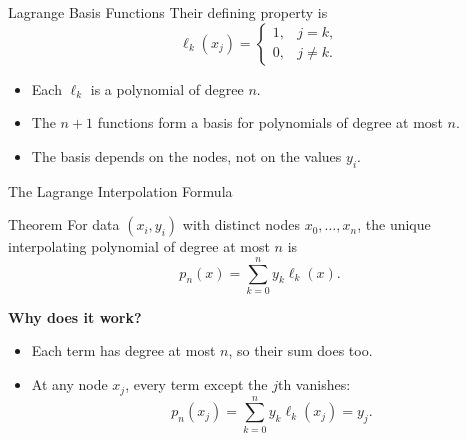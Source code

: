\documentclass[10pt]{beamer}
\begin{document}
\begin{frame}{Lagrange Basis Functions}
Their defining property is
\[
\ell_k(x_j)=
\begin{cases}
1,&j=k,\\
0,&j\ne k.
\end{cases}
\]
\begin{itemize}
    \item Each $\ell_k$ is a polynomial of degree $n$.
    \item The $n+1$ functions form a basis for polynomials of degree at most $n$.
    \item The basis depends on the nodes, not on the values $y_i$.
\end{itemize}
\end{frame}

\begin{frame}{The Lagrange Interpolation Formula}
\begin{block}{Theorem}
For data $(x_i,y_i)$ with distinct nodes $x_0,\ldots,x_n$,
the unique interpolating polynomial of degree at most $n$ is
\[
\boxed{p_n(x)=\sum_{k=0}^n y_k\ell_k(x).}
\]
\end{block}
\textbf{Why does it work?}
\begin{itemize}
    \item Each term has degree at most $n$, so their sum does too.
    \item At any node $x_j$, every term except the $j$th vanishes:
    \[
    p_n(x_j)=\sum_{k=0}^n y_k\ell_k(x_j)=y_j.
    \]
\end{itemize}
\end{frame}
\end{document}
